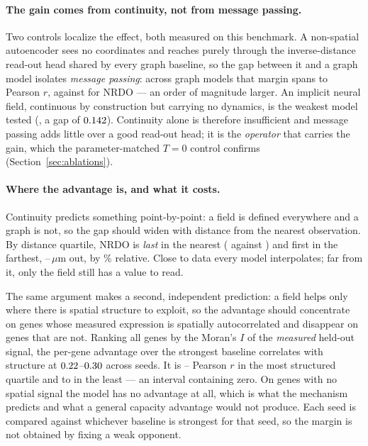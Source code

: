 \paragraph{The gain comes from continuity, not from message passing.}
Two controls localize the effect, both measured on this benchmark. A non-spatial
autoencoder sees no coordinates and reaches \MSAEPearson{} purely through the
inverse-distance read-out head shared by every graph baseline, so the gap between
it and a graph model isolates \emph{message passing}: across \MSNGraphModels{}
graph models that margin spans \MSWorstGraphOverAE{} to \MSBestGraphOverAE{}
Pearson $r$, against \MSNMOOverAE{} for NRDO --- an order of magnitude larger. An
implicit neural field, continuous by construction but carrying no dynamics, is
the weakest model tested (\MSWeakestPearson{}, a gap of $0.142$). Continuity
alone is therefore insufficient and message passing adds little over a good
read-out head; it is the \emph{operator} that carries the gain, which the
parameter-matched $T{=}0$ control confirms (Section~\ref{sec:ablations}).


\paragraph{Where the advantage is, and what it costs.}
Continuity predicts something point-by-point: a field is defined everywhere and
a graph is not, so the gap should widen with distance from the nearest
observation. By distance quartile, NRDO is \emph{last} in the nearest
(\DistNearNMO{} against \DistNearBest{}) and first in the farthest,
\DistFarLoUm--\DistFarHiUm\,$\mu$m out, by \DistFarGainPct\% relative. Close to
data every model interpolates; far from it, only the field still has a value to
read.

The same argument makes a second, independent prediction: a field helps only
where there is spatial structure to exploit, so the advantage should concentrate
on genes whose measured expression is spatially autocorrelated and disappear on
genes that are not. Ranking all \GeneNGenes{} genes by the Moran's $I$ of the
\emph{measured} held-out signal, the per-gene advantage over the strongest
baseline correlates with structure at $0.22$--$0.30$ across
\GeneSeeds{} seeds. It is \GeneTopLo--\GeneTopHi{} Pearson $r$ in the most
structured quartile and \GeneBotLo{} to \GeneBotHi{} in the least --- an
interval containing zero. On genes with no spatial signal the model has no
advantage at all, which is what the mechanism predicts and what a general
capacity advantage would not produce. Each seed is compared against whichever
baseline is strongest for that seed, so the margin is not obtained by fixing a
weak opponent.

